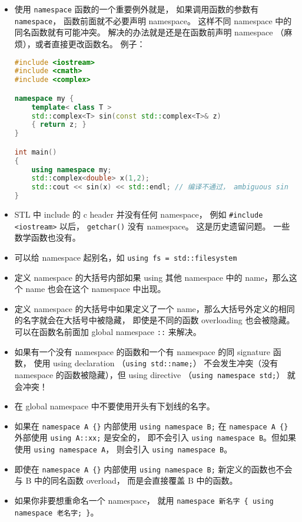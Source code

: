 
\begin{issues}
\issueDraft
\end{issues}

\begin{itemize}
\item 使用 \verb`namespace` 函数的一个重要例外就是， 如果调用函数的参数有 \verb`namespace`， 函数前面就不必要声明 namespace。 这样不同 namespace 中的同名函数就有可能冲突。 解决的办法就是还是在函数前声明 namespace （麻烦），或者直接更改函数名。 例子：
\begin{lstlisting}[language=cpp]
#include <iostream>
#include <cmath>
#include <complex>

namespace my {
	template< class T >
	std::complex<T> sin(const std::complex<T>& z)
	{ return z; }
}

int main()
{
	using namespace my;
	std::complex<double> x(1,2);
	std::cout << sin(x) << std::endl; // 编译不通过， ambiguous sin
}
\end{lstlisting}
\item STL 中 include 的 c header 并没有任何 namespace， 例如 \verb`#include <iostream>` 以后， \verb`getchar()` 没有 namespace。 这是历史遗留问题。 一些数学函数也没有。
\item 可以给 namespace 起别名，如 \verb`using fs = std::filesystem`
\item 定义 namespace 的大括号内部如果 using 其他 namespace 中的 name，那么这个 name 也会在这个 namespace 中出现。
\item 定义 namespace 的大括号中如果定义了一个 name，那么大括号外定义的相同的名字就会在大括号中被隐藏， 即使是不同的函数 overloading 也会被隐藏。 可以在函数名前面加 global namespace \verb`::` 来解决。
\item 如果有一个没有 namespace 的函数和一个有 namespace 的同 signature 函数， 使用 using declaration （\verb`using std::name;`） 不会发生冲突（没有 namespace 的函数被隐藏），但 using directive （\verb`using namespace std;`） 就会冲突！
\item 在 global namespace 中不要使用开头有下划线的名字。
\item 如果在 \verb`namespace A {}` 内部使用 \verb`using namespace B;` 在 \verb`namespace A {}` 外部使用 \verb`using A::xx;` 是安全的， 即不会引入 \verb`using namespace B`。但如果使用 \verb`using namespace A`， 则会引入 \verb`using namespace B`。
\item 即使在 \verb`namespace A {}` 内部使用 \verb`using namespace B;`  新定义的函数也不会与 B 中的同名函数 overload， 而是会直接覆盖 B 中的函数。
\item 如果你非要想重命名一个 namespace， 就用 \verb`namespace 新名字 { using namespace 老名字; }`。
\end{itemize}
